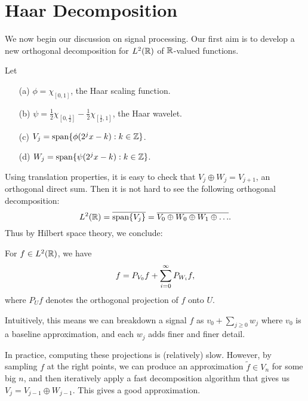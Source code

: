 \section{Haar Decomposition}
We now begin our discussion on signal processing. Our first aim is to develop a new orthogonal decomposition for $L^2({\mathbb R})$ of ${\mathbb R}$-valued functions.
\begin{dfn}
    Let
    \begin{itemize}
        \item[(a)] $\phi = \chi_{[0,1]}$, the Haar scaling function.
        \item[(b)] $\psi = \frac{1}{2}\chi_{[0, \frac{1}{2}]} 
            - \frac{1}{2}\chi_{[ \frac{1}{2},1]}$, the Haar wavelet.
        \item[(c)] $V_j = \operatorname{span}\{\phi(2^jx - k): k \in {\mathbb Z}\}$.
        \item[(d)] $W_j = \operatorname{span}\{\psi(2^jx - k): k \in {\mathbb Z}\}$.
    \end{itemize}
\end{dfn}
Using translation properties, it is easy to check that $V_j \oplus W_j = V_{j+1}$, an orthogonal direct sum. Then it is not hard to see the following orthogonal decomposition:
\[
    L^2({\mathbb R}) = \overline{\operatorname{span}\{V_j\}}
    = \overline{V_0 \oplus W_0 \oplus  W_1 \oplus \dots}.
\]
Thus by Hilbert space theory, we conclude:
\begin{thm}
    For $f \in L^2({\mathbb R})$, we have
    \[
        f = P_{V_0}f + \sum_{i = 0}^\infty P_{W_i}f,
    \]
    where $P_U f$ denotes the orthogonal projection of $f$ onto $U$.
\end{thm}
Intuitively, this means we can breakdown a signal $f$ as $v_0 + \sum_{j \geq 0} w_j$ where $v_0$ is a baseline approximation, and each $w_j$ adds finer and finer detail.

In practice, computing these projections is (relatively) slow. However, by sampling $f$ at the right points, we can produce an approximation $\tilde{f} \in V_n$ for some big $n$, and then iteratively apply a fast decomposition algorithm that gives us $V_j = V_{j-1} \oplus W_{j-1}$. This gives a good approximation.

